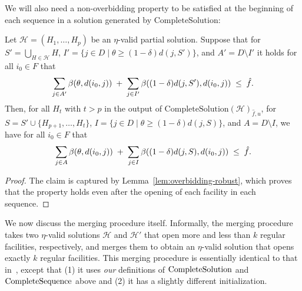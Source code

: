 We will also need a non-overbidding property to be satisfied at the beginning of each sequence in a solution generated by $\mathrm{CompleteSolution}$:

\begin{lemma}
\label{lem:seq-overbidding}
Let $\mathcal{H} = (H_1, \ldots, H_{p})$ be an $\eta$-valid partial solution.
Suppose that for $S' = \bigcup_{H \in \mathcal{H}} H$, $I' = \{j \in D \mid \theta \geq (1-\delta) d(j, S')\}$, and $A' = D \setminus I'$ it holds for all $i_0 \in F$ that
    \[\sum_{j\in A'}\beta(\theta,d(i_0,j))
\;+\;
\sum_{j\in I'}\beta((1-\delta)  d(j,S'), d(i_0,j))
\;\le\; \hat f.\]
Then, for all $H_t$ with $t > p$ in the output of $\mathrm{CompleteSolution}(\mathcal{H})_{\hat f, u}$, for $S = S' \cup \{H_{p+1}, \ldots, H_{t}\}$, $I = \{j \in D \mid \theta \geq (1-\delta) d(j, S)\}$, and $A = D \setminus I$, we have for all $i_0 \in F$ that 
    \[\sum_{j\in A}\beta(\theta,d(i_0,j))
\;+\;
\sum_{j\in I}\beta((1-\delta)  d(j,S), d(i_0,j))
\;\le\; \hat f.\]
\end{lemma}
\begin{proof}
The claim is captured by Lemma~\ref{lem:overbidding-robust}, which proves that the property holds even after the opening of each facility in each sequence.
\end{proof}

We now discuss the merging procedure itself.
Informally, the merging procedure takes two $\eta$-valid solutions $\mathcal{H}$ and $\mathcal{H}'$ that open more and less than $k$ regular facilities, respectively, and merges them to obtain an $\eta$-valid solution that opens exactly $k$ regular facilities.
This merging procedure is essentially identical to that in~\cite{MR4928455-Cohen25}, except that (1) it uses \emph{our} definitions of $\textrm{CompleteSolution}$ and $\textrm{CompleteSequence}$ above and (2) it has a slightly different initialization.

